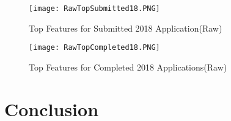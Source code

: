 \documentclass[12pt]{article}
\begin{document}
\begin{figure}[!htb]
  \centering
  \texttt{[image: RawTopSubmitted18.PNG]}
  \caption{Top Features for Submitted 2018 Application(Raw)}
  \label{fig:feature_importance}
\end{figure}

\begin{figure}[!htb]
  \centering
  \texttt{[image: RawTopCompleted18.PNG]}
  \caption{Top Features for Completed 2018 Applications(Raw)}
  \label{fig:feature_importance}
\end{figure}


\section{Conclusion}


\printbibliography
%   


\end{document}
